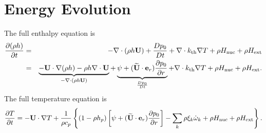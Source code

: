 \documentclass[11pt]{article}
\def\Ub    {{\bf U}}
\def\ut    {\widetilde{\bf U}}
\def\er    {{\bf e}_r}
\def\kth   {k_\mathrm{th}}
\begin{document}
\section{Energy Evolution}
The full enthalpy equation is
\begin{eqnarray}
\frac{\partial(\rho h)}{\partial t} &=& -\nabla\cdot(\rho h \Ub) + \frac{Dp_0}{Dt} 
+ \nabla\cdot \kth \nabla T + \rho H_{\rm nuc} + \rho H_{\rm ext} \nonumber \\
&=& \underbrace{-\Ub\cdot\nabla(\rho h) - \rho h\nabla\cdot\Ub}_{-\nabla\cdot(\rho h\Ub)} 
+ \underbrace{\psi + (\ut \cdot \er) \frac{\partial p_0}{\partial r}}_{\frac{Dp_0}{Dt}} 
+ \nabla\cdot\kth\nabla T + \rho H_{\rm nuc} + \rho H_{\rm ext}.
\end{eqnarray}
The full temperature equation is
\begin{equation}
\frac{\partial T}{\partial t} = -\Ub\cdot\nabla T
+ \frac{1}{\rho c_p}\left\{(1-\rho h_p)\left[\psi
+ (\ut \cdot \er )\frac{\partial p_0}{\partial r}\right] - \sum_k\rho\xi_k\dot\omega_k 
+ \rho H_{\rm nuc} + \rho H_{\rm ext}\right\}.
\end{equation}
\end{document}
